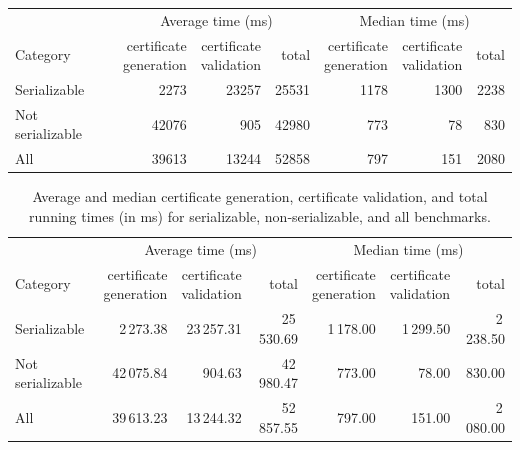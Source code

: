 \begin{table}[H]
	\centering
	\begin{tabular}{lrrrrrr}
		\toprule
		& \multicolumn{3}{c}{Average time (ms)} & \multicolumn{3}{c}{Median time (ms)} \\
		\cmidrule(lr){2-4} \cmidrule(lr){5-7}
		Category
		& \shortstack{certificate\\generation}
		& \shortstack{certificate\\validation}
		& total
		& \shortstack{certificate\\generation}
		& \shortstack{certificate\\validation}
		& total \\
		\midrule
		Serializable     &  2273  & 23257 & 25531 & 1178 & 1300 & 2238 \\
		Not serializable & 42076  &   905 & 42980 &  773 &   78 &  830 \\
		All              & 39613  & 13244 & 52858 &  797 &  151 & 2080 \\
		\bottomrule
	\end{tabular}
\end{table}



\begin{table}[H]
	\centering
	\begin{tabular}{lrrrrrr}
		\toprule
		& \multicolumn{3}{c}{Average time (ms)} & \multicolumn{3}{c}{Median time (ms)} \\
		\cmidrule(lr){2-4} \cmidrule(lr){5-7}
		Category
		& \shortstack{certificate\\generation}
		& \shortstack{certificate\\validation}
		& total
		& \shortstack{certificate\\generation}
		& \shortstack{certificate\\validation}
		& total \\
		\midrule
		Serializable        &   2\,273.38 &  23\,257.31 &  25\,530.69   & 1\,178.00 &  1\,299.50 &  2\,238.50 \\
		Not serializable    &  42\,075.84 &     904.63 &  42\,980.47   &   773.00 &     78.00 &    830.00 \\
		All                 &  39\,613.23 &  13\,244.32 &  52\,857.55   &   797.00 &    151.00 &  2\,080.00 \\
		\bottomrule
	\end{tabular}
	\caption{Average and median certificate generation, certificate validation, and total running times (in ms) for serializable, non‐serializable, and all benchmarks.}
	\label{tab:stats-summary}
\end{table}





